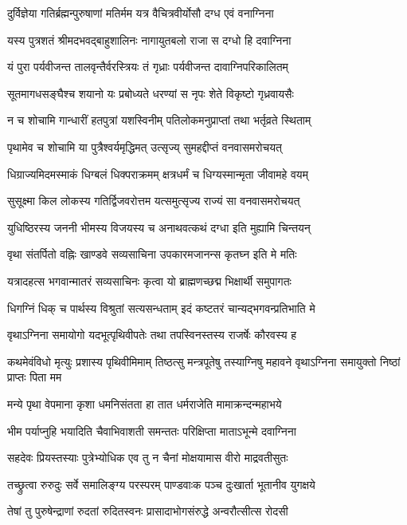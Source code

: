 \twolineshloka
{दुर्विज्ञेया गतिर्ब्रह्मन्पुरुषाणां मतिर्मम}
{यत्र वैचित्रवीर्योसौ दग्ध एवं वनाग्निना}


\twolineshloka
{यस्य पुत्रशतं श्रीमदभवद्बाहुशालिनः}
{नागायुतबलो राजा स दग्धो हि दवाग्निना}


\twolineshloka
{यं पुरा पर्यवीजन्त तालवृन्तैर्वरस्त्रियः}
{तं गृध्राः पर्यवीजन्त दावाग्निपरिकालितम्}


\twolineshloka
{सूतमागधसङ्घैश्च शयानो यः प्रबोध्यते}
{धरण्यां स नृपः शेते विकृष्टो गृध्रवायसैः}


\twolineshloka
{न च शोचामि गान्धारीं हतपुत्रां यशस्विनीम्}
{पतिलोकमनुप्राप्तां तथा भर्तृव्रते स्थिताम्}


\twolineshloka
{पृथामेव च शोचामि या पुत्रैश्वर्यमृद्धिमत्}
{उत्सृज्य् सुमहद्दीप्तं वनवासमरोचयत्}


\twolineshloka
{धिग्राज्यमिदमस्माकं धिग्बलं धिक्पराक्रमम्}
{क्षत्रधर्मं च धिग्यस्मान्मृता जीवामहे वयम्}


\twolineshloka
{सुसूक्ष्मा किल लोकस्य गतिर्द्विजवरोत्तम}
{यत्समुत्सृज्य राज्यं सा वनवासमरोचयत्}


\twolineshloka
{युधिष्ठिरस्य जननी भीमस्य विजयस्य च}
{अनाथवत्कथं दग्धा इति मुह्यामि चिन्तयन्}


\twolineshloka
{वृथा संतर्पितो वह्निः खाण्डवे सव्यसाचिना}
{उपकारमजानन्स कृतघ्न इति मे मतिः}


\twolineshloka
{यत्रादहत्स भगवान्मातरं सव्यसाचिनः}
{कृत्वा यो ब्राह्मणच्छद्म भिक्षार्थी समुपागतः}


\twolineshloka
{धिगग्निं धिक् च पार्थस्य विश्रुतां सत्यसन्धताम्}
{इदं कष्टतरं चान्यद्भगवन्प्रतिभाति मे}


\twolineshloka
{वृथाऽग्निना समायोगो यदभूत्पृथिवीपतेः}
{तथा तपस्विनस्तस्य राजर्षेः कौरवस्य ह}


कथमेवंविधो मृत्युः प्रशास्य पृथिवीमिमाम्
\twolineshloka
{तिष्ठत्सु मन्त्रपूतेषु तस्याग्निषु महावने}
{वृथाऽग्निना समायुक्तो निष्ठां प्राप्तः पिता मम}


\twolineshloka
{मन्ये पृथा वेपमाना कृशा धमनिसंतता}
{हा तात धर्मराजेति मामाक्रन्दन्महाभये}


\twolineshloka
{भीम पर्याप्नुहि भयादिति चैवाभिवाशती}
{समन्ततः परिक्षिप्ता माताऽभून्मे दवाग्निना}


\twolineshloka
{सहदेवः प्रियस्तस्याः पुत्रेभ्योधिक एव तु}
{न चैनां मोक्षयामास वीरो माद्रवतीसुतः}


\twolineshloka
{तच्छ्रुत्वा रुरुदुः सर्वे समालिङ्ग्य परस्परम्}
{पाण्डवाःक पञ्च दुःखार्ता भूतानीव युगक्षये}


\twolineshloka
{तेषां तु पुरुषेन्द्राणां रुदतां रुदितस्वनः}
{प्रासादाभोगसंरुद्धे अन्वरौत्सीत्स रोदसी}


